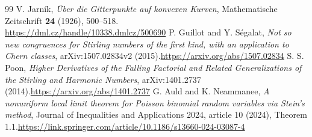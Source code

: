 \documentclass[11pt,a4paper]{article}
\numberwithin{equation}{section}
\begin{document}
\begin{thebibliography}{99}
V. Jarn\'ik, \emph{\"Uber die Gitterpunkte auf konvexen Kurven}, Mathematische Zeitschrift \textbf{24} (1926), 500--518.\\\url{https://dml.cz/handle/10338.dmlcz/500690}
 P. Guillot and Y. S\'egalat, \emph{Not so new congruences for Stirling numbers of the first kind, with an application to Chern classes}, arXiv:1507.02834v2 (2015).\newline\url{https://arxiv.org/abs/1507.02834}
 S. S. Poon, \emph{Higher Derivatives of the Falling Factorial and Related Generalizations of the Stirling and Harmonic Numbers}, arXiv:1401.2737 (2014).\newline\url{https://arxiv.org/abs/1401.2737}
 G. Auld and K. Neammanee, \emph{A nonuniform local limit theorem for Poisson binomial random variables via Stein's method}, Journal of Inequalities and Applications 2024, article 10 (2024), Theorem 1.1.\newline\url{https://link.springer.com/article/10.1186/s13660-024-03087-4}
\end{thebibliography}
\end{document}

